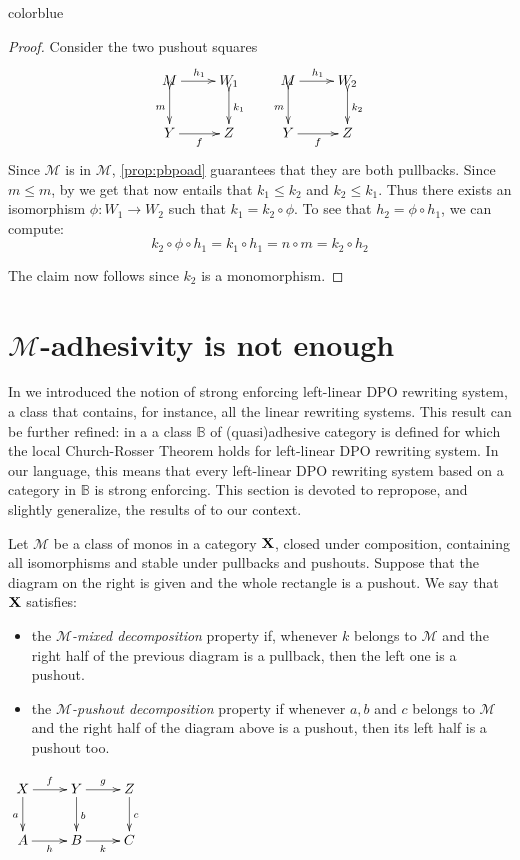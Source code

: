 \documentclass[a4paper,UKenglish,cleveref,pdftex, thm-restate,numberwithinsect,anonymous]{lipics}
\newcommand{\full}[1]{{color{blue}#1}}
\newcommand{\full}[1]{}
\def\X{\textbf {\textup{X}}}
\def\Y{\textbf {\textup{Y}}}
\begin{document}
\full{ 
\begin{proof}
	Consider the two pushout squares
	\[\xymatrix{M \ar[r]^{h_1}\ar@{>->}[d]_{m}& W_1 \ar@{>->}[d]^{k_1} & M \ar@{>->}[d]_{m} \ar[r]^{h_1}& W_2 \ar@{>->}[d]^{k_2}\\Y\ar[r]_{f}&Z &Y \ar[r]_{f}&Z}\]
	Since $\mathcal{M}$ is in $\mathcal{M}$, \cref{prop:pbpoad} guarantees that they are both pullbacks.
	Since $m\leq m$, by \Cref{lem:radj} we get that now entails that $k_1\leq k_2$ and $k_2\leq k_1$. Thus there exists an isomorphism $\phi\colon W_1\to W_2$ such that $k_1=k_2\circ \phi$. To see that $h_2=\phi\circ h_1$, we can compute:
	\[
		k_2\circ \phi \circ h_1  = k_1\circ h_1= n\circ m= k_2\circ h_2\]

	The claim now follows since $k_2$ is a monomorphism.
\end{proof}}



\section{$\mathcal{M}$-adhesivity is not enough}\label{app:fill}
In  we introduced the notion of strong enforcing left-linear DPO rewriting system, a class that contains, for instance, all the linear rewriting systems. This result can be further refined: in a\cite{baldan2011adhesivity} a class  $\mathbb{B}$ of (quasi)adhesive category is defined for which the local Church-Rosser Theorem holds for left-linear DPO rewriting system. In our language, this means that every left-linear DPO rewriting system based on a category in $\mathbb{B}$ is strong enforcing. This section is devoted to repropose, and slightly generalize, the results of \cite{baldan2011adhesivity} to our context.

\noindent
\parbox{10.4cm}{
	\begin{definition}Let $\mathcal{M}$ be a class of monos in a category $\X$, closed under composition, containing all isomorphisms and stable under pullbacks and pushouts. Suppose that the  diagram on the right 	is given and the whole rectangle is a pushout. We say that $\X$ satisfies:
		\parbox{14cm}{\begin{itemize}
				\item the \emph{$\mathcal{M}$-mixed decomposition} property if, whenever $k$ belongs to $\mathcal{M}$ and the right half of the previous diagram is a pullback, then the left one is a pushout.
				\item the \emph{$\mathcal{M}$-pushout decomposition} property if whenever $a, b$ and $c$ belongs to $\mathcal{M}$ and the right half of the diagram above is a pushout, then its left half is a pushout too.
			\end{itemize}}
	\end{definition}} \parbox{3cm}{\vspace{-2cm}$\xymatrix{X \ar[d]_{a} \ar[r]^{f}& \ar[r]^{g} Y \ar[d]^{b}& Z \ar[d]^{c}\\ A \ar[r]_{h}& B \ar[r]_{k}& C}$}\\
\end{document}
